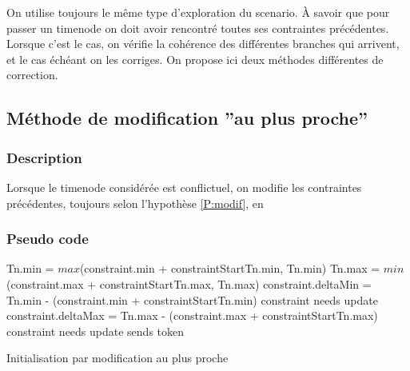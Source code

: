 \documentclass[10pt,a4paper]{article}
\newcommand{\hyporef}[1]{l'hypothèse \ref{#1}}
\begin{document}
On utilise toujours le même type d'exploration du scenario. À savoir que pour passer un timenode on doit avoir rencontré toutes ses contraintes précédentes. Lorsque c'est le cas, on vérifie la cohérence des différentes branches qui arrivent, et le cas échéant on les corriges. On propose ici deux méthodes différentes de correction.

	\subsection{Méthode de modification ''au plus proche''}
		\subsubsection{Description}
Lorsque le timenode considérée est conflictuel, on modifie les contraintes précédentes, toujours selon \hyporef{P:modif}, en 

		\subsubsection{Pseudo code}

	\begin{algorithm}[htp]
		\label{A:init:near}
		\begin{algorithmic}[2]
						\State Tn.min = $max$(constraint.min + constraintStartTn.min, Tn.min)
						\State Tn.max = $min$(constraint.max + constraintStartTn.max, Tn.max)
					\EndFor
						\State constraint.deltaMin = Tn.min - (constraint.min + constraintStartTn.min)
							\State constraint needs update
						\EndIf
						\State constraint.deltaMax = Tn.max - (constraint.max + constraintStartTn.max)
							\State constraint needs update
						\EndIf
					\EndFor
							\State sends token
						\EndFor
					\EndIf
				\EndIf
			\EndFunction
		\end{algorithmic}
			\caption*{Initialisation par modification au plus proche}
	\end{algorithm}	
	
\end{document}
